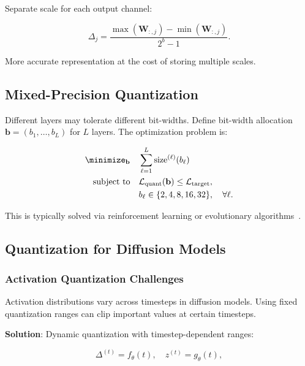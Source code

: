 \documentclass[12pt]{report}
\theoremstyle{definition}
\newcommand{\loss}{\mathcal{L}}
\begin{document}
Separate scale for each output channel:

\begin{equation}
\Delta_j = \frac{\max(\mathbf{W}_{:,j}) - \min(\mathbf{W}_{:,j})}{2^b - 1}.
\label{eq:per_channel_scale}
\end{equation}

More accurate representation at the cost of storing multiple scales.

\subsection{Mixed-Precision Quantization}

Different layers may tolerate different bit-widths. Define bit-width allocation $\mathbf{b} = (b_1, \ldots, b_L)$ for $L$ layers. The optimization problem is:

\begin{equation}
\begin{aligned}
\minimize_{\mathbf{b}} \quad & \sum_{\ell=1}^L \text{size}^{(\ell)}(b_\ell) \\
\text{subject to} \quad & \loss_{\text{quant}}(\mathbf{b}) \leq \loss_{\text{target}}, \\
& b_\ell \in \{2, 4, 8, 16, 32\}, \quad \forall \ell.
\end{aligned}
\label{eq:mixed_precision_opt}
\end{equation}

This is typically solved via reinforcement learning or evolutionary algorithms~\citep{wang2019haq}.

\subsection{Quantization for Diffusion Models}

\subsubsection{Activation Quantization Challenges}

Activation distributions vary across timesteps in diffusion models. Using fixed quantization ranges can clip important values at certain timesteps.

\textbf{Solution}: Dynamic quantization with timestep-dependent ranges:

\begin{equation}
\Delta^{(t)} = f_\theta(t), \quad z^{(t)} = g_\theta(t),
\label{eq:dynamic_quant}
\end{equation}
\end{document}
